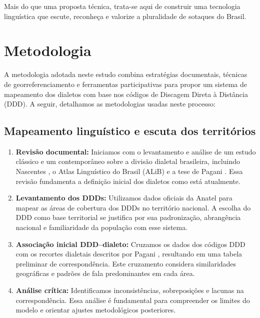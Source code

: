 Mais do que uma proposta técnica, trata-se aqui de construir uma tecnologia linguística que escute, reconheça e valorize a pluralidade de sotaques do Brasil.











\chapter{Metodologia}



A metodologia adotada neste estudo combina estratégias documentais, técnicas de georreferenciamento e ferramentas participativas para propor um sistema de mapeamento dos dialetos com base nos códigos de Discagem Direta à Distância (DDD).  A seguir, detalhamos as metodologias usadas neste processo:

\section{Mapeamento linguístico e escuta dos territórios}

\begin{enumerate}
  \item \textbf{Revisão documental:} Iniciamos com o levantamento e análise de um estudo clássico e um contemporâneo sobre a divisão dialetal brasileira, incluindo Nascentes \cite{nascentes1953}, o Atlas Linguístico do Brasil (ALiB) \cite{cardoso2014alib} e a tese de Pagani \cite{pagani2022}. Essa revisão fundamenta a definição inicial dos dialetos como está atualmente.

  \item \textbf{Levantamento dos DDDs:} Utilizamos dados oficiais da Anatel \cite{anatel_pnb} para mapear as áreas de cobertura dos DDDs no território nacional. A escolha do DDD como base territorial se justifica por sua padronização, abrangência nacional e familiaridade da população com esse sistema.

  \item \textbf{Associação inicial DDD–dialeto:} Cruzamos os dados dos códigos DDD com os recortes dialetais descritos por Pagani \cite{pagani2022}, resultando em uma tabela preliminar de correspondência. Este cruzamento considera similaridades geográficas e padrões de fala predominantes em cada área.

  \item \textbf{Análise crítica:} Identificamos inconsistências, sobreposições e lacunas na correspondência. Essa análise é fundamental para compreender os limites do modelo e orientar ajustes metodológicos posteriores.
\end{enumerate}


